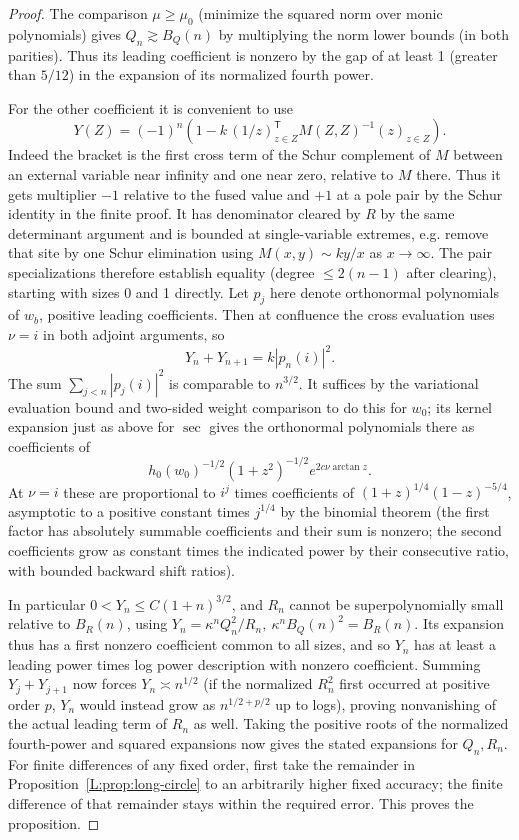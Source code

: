 \documentclass[11pt]{article}
\numberwithin{equation}{section}
\theoremstyle{definition}\newtheorem{definition}[theorem]{Definition}
\theoremstyle{remark}\newtheorem{remark}[theorem]{Remark}
\begin{document}
\begin{proof}
The comparison \(\mu\ge\mu_0\) (minimize the squared norm over monic polynomials) gives \(Q_n\gtrsim B_Q(n)\) by multiplying the norm lower bounds (in both parities). Thus its leading coefficient is nonzero by the gap of at least 1 (greater than \(5/12\)) in the expansion of its normalized fourth power.

For the other coefficient it is convenient to use
\[
 Y(Z)=(-1)^n\left(1-k\,(1/z)_{z\in Z}^{\mathsf T}M(Z,Z)^{-1}(z)_{z\in Z}\right).
\]
Indeed the bracket is the first cross term of the Schur complement of \(M\) between an external variable near infinity and one near zero, relative to \(M\) there. Thus it gets multiplier \(-1\) relative to the fused value and \(+1\) at a pole pair by the Schur identity in the finite proof. It has denominator cleared by \(R\) by the same determinant argument and is bounded at single-variable extremes, e.g. remove that site by one Schur elimination using \(M(x,y)\sim k y/x\) as \(x\to\infty\). The pair specializations therefore establish equality (degree \(\le2(n-1)\) after clearing), starting with sizes 0 and 1 directly. Let \(p_j\) here denote orthonormal polynomials of \(w_b\), positive leading coefficients. Then at confluence the cross evaluation uses \(\nu=i\) in both adjoint arguments, so
\[
 Y_n+Y_{n+1}=k|p_n(i)|^2 .
\]
The sum \(\sum_{j<n}|p_j(i)|^2\) is comparable to \(n^{3/2}\). It suffices by the variational evaluation bound and two-sided weight comparison to do this for \(w_0\); its kernel expansion just as above for \(\sec\) gives the orthonormal polynomials there as coefficients of
\[
 h_0(w_0)^{-1/2} (1+z^2)^{-1/2}e^{2c\nu\arctan z}.
\]
At \(\nu=i\) these are proportional to \(i^j\) times coefficients of \((1+z)^{1/4}(1-z)^{-5/4}\), asymptotic to a positive constant times \(j^{1/4}\) by the binomial theorem (the first factor has absolutely summable coefficients and their sum is nonzero; the second coefficients grow as constant times the indicated power by their consecutive ratio, with bounded backward shift ratios).

In particular \(0<Y_n\le C(1+n)^{3/2}\), and \(R_n\) cannot be superpolynomially small relative to \(B_R(n)\), using \(Y_n=\kappa^n Q_n^2/R_n,\ \kappa^n B_Q(n)^2=B_R(n)\). Its expansion thus has a first nonzero coefficient common to all sizes, and so \(Y_n\) has at least a leading power times log power description with nonzero coefficient. Summing \(Y_j+Y_{j+1}\) now forces \(Y_n\asymp n^{1/2}\) (if the normalized \(R_n^2\) first occurred at positive order \(p\), \(Y_n\) would instead grow as \(n^{1/2+p/2}\) up to logs), proving nonvanishing of the actual leading term of \(R_n\) as well. Taking the positive roots of the normalized fourth-power and squared
expansions now gives the stated expansions for $Q_n,R_n$. For finite
differences of any fixed order, first take the remainder in
Proposition~\ref{L:prop:long-circle} to an arbitrarily higher fixed accuracy;
the finite difference of that remainder stays within the required error.
This proves the proposition.
\end{proof}
\end{document}
